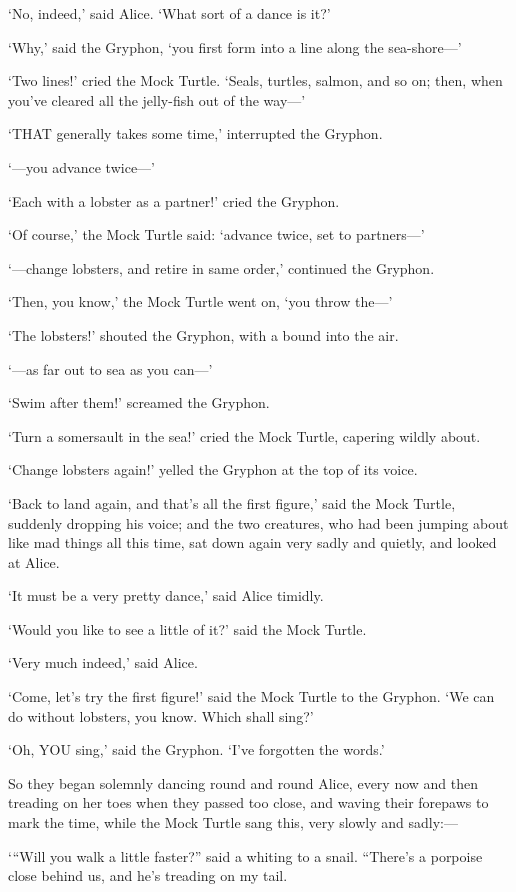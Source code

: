 \documentclass[12pt]{book}
\begin{document}
\begin{Parallel}[p]{}{}
{‘No, indeed,’ said Alice. ‘What sort of a dance is it?’

‘Why,’ said the Gryphon, ‘you first form into a line along the sea-shore—’

‘Two lines!’ cried the Mock Turtle. ‘Seals, turtles, salmon, and so on; then, when you’ve cleared all the jelly-fish out of the way—’

‘THAT generally takes some time,’ interrupted the Gryphon.

‘—you advance twice—’

‘Each with a lobster as a partner!’ cried the Gryphon.

‘Of course,’ the Mock Turtle said: ‘advance twice, set to partners—’

‘—change lobsters, and retire in same order,’ continued the Gryphon.

‘Then, you know,’ the Mock Turtle went on, ‘you throw the—’

‘The lobsters!’ shouted the Gryphon, with a bound into the air.

‘—as far out to sea as you can—’

‘Swim after them!’ screamed the Gryphon.

‘Turn a somersault in the sea!’ cried the Mock Turtle, capering wildly about.

‘Change lobsters again!’ yelled the Gryphon at the top of its voice.

‘Back to land again, and that’s all the first figure,’ said the Mock Turtle, suddenly dropping his voice; and the two creatures, who had been jumping about like mad things all this time, sat down again very sadly and quietly, and looked at Alice.

‘It must be a very pretty dance,’ said Alice timidly.

‘Would you like to see a little of it?’ said the Mock Turtle.

‘Very much indeed,’ said Alice.

‘Come, let’s try the first figure!’ said the Mock Turtle to the Gryphon. ‘We can do without lobsters, you know. Which shall sing?’

‘Oh, YOU sing,’ said the Gryphon. ‘I’ve forgotten the words.’

So they began solemnly dancing round and round Alice, every now and then treading on her toes when they passed too close, and waving their forepaws to mark the time, while the Mock Turtle sang this, very slowly and sadly:—

 ‘“Will you walk a little faster?” said a whiting to a snail.
 “There’s a porpoise close behind us, and he’s treading on my tail.

}
\end{Parallel}
\end{document}
